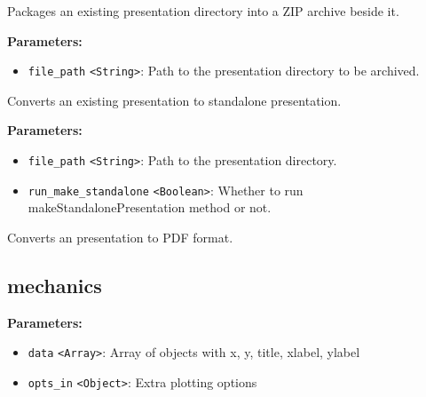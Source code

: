 \documentclass[12pt,a4paper]{article}
\begin{document}
\noindent Packages an existing presentation directory into a ZIP archive beside it.

\vspace{5mm}
\noindent {}


\noindent \textbf{Parameters:}
\begin{itemize}
  \item \texttt{file\_path} \texttt{<String>}: Path to the presentation directory to be archived.
\end{itemize}

\noindent Converts an existing presentation to standalone presentation.

\vspace{5mm}
\noindent {}


\noindent \textbf{Parameters:}
\begin{itemize}
  \item \texttt{file\_path} \texttt{<String>}: Path to the presentation directory.
  \item \texttt{run\_make\_standalone} \texttt{<Boolean>}: Whether to run makeStandalonePresentation method or not.
\end{itemize}

\noindent Converts an presentation to PDF format.


\subsection{mechanics}
\vspace{5mm}
\noindent {}


\noindent \textbf{Parameters:}
\begin{itemize}
  \item \texttt{data} \texttt{<Array>}: Array of objects with x, y, title, xlabel, ylabel
  \item \texttt{opts\_in} \texttt{<Object>}: Extra plotting options
\end{itemize}
\end{document}
